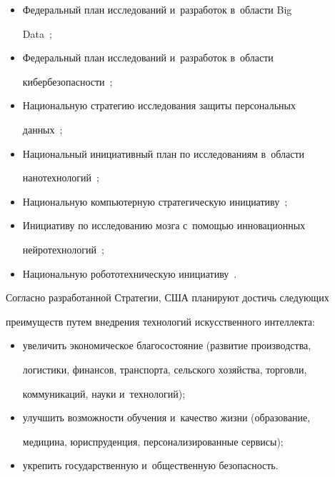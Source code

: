   \begin{itemize}


\item Федеральный план исследований и~разработок в~об\-ласти Big


Data~\cite{5-bor};


\item Федеральный план исследований и~разработок в~об\-ласти


кибербезопасности~\cite{6-bor};


\item Национальную стратегию исследования защиты персональных


данных~\cite{7-bor};


\item Национальный инициативный план по исследованиям в~об\-ласти


нанотехнологий~\cite{8-bor};


\item Национальную компьютерную стратегическую инициативу~\cite{9-bor};


\item Инициативу по исследованию мозга с~по\-мощью инновационных


нейротехнологий~\cite{10-bor};


\item Национальную робототехническую инициативу~\cite{11-bor}.


  \end{itemize}





  Согласно разработанной Стратегии, США планируют достичь следующих


преимуществ путем внед\-ре\-ния технологий искусственного интеллекта:


  \begin{itemize}


\item увеличить экономическое бла\-го\-со\-сто\-яние (развитие производства,


логистики, финансов, транспорта, сельского хозяйства, торговли,


коммуникаций, науки и~технологий);


\item улучшить возможности обуче\-ния и~качество жизни (образование,


медицина, юриспруденция, персонализированные сервисы);


\item укрепить государственную и~общественную безопас\-ность.


  \end{itemize}





